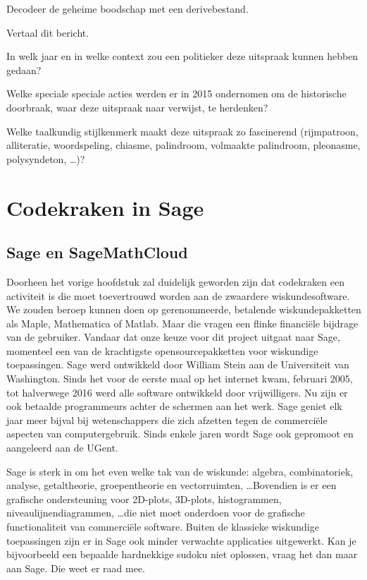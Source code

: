 \begin{oef}
Decodeer de geheime boodschap met een derivebestand.

\begin{enumoef}
\item Vertaal dit bericht. 
\item In welk jaar en in welke context zou een politieker deze uitspraak  kunnen hebben gedaan? 
\item Welke speciale speciale acties werden er in 2015 ondernomen om de historische doorbraak, waar deze uitspraak naar verwijst, te herdenken?
\item Welke taalkundig stijlkenmerk maakt deze uitspraak zo fascinerend (rijmpatroon, alliteratie, woordspeling, chiasme, palindroom, volmaakte palindroom, pleonasme, polysyndeton, \dots)?
\end{enumoef}
\end{oef}

\newpage


\section{Codekraken in Sage}
\subsection{Sage en SageMathCloud}
Doorheen het vorige hoofdstuk zal duidelijk geworden zijn dat codekraken een activiteit is die moet toevertrouwd worden aan de zwaardere wiskundesoftware. We zouden beroep kunnen doen op gerenommeerde, betalende wiskundepakketten als Maple, Mathematica of Matlab. Maar die vragen een flinke financiële bijdrage van de gebruiker. Vandaar dat onze keuze voor dit project uitgaat naar Sage, momenteel een van de krachtigste opensourcepakketten voor wiskundige toepassingen. Sage werd ontwikkeld door William Stein aan de Universiteit van Washington. Sinds het voor de eerste maal op het internet kwam, februari 2005, tot halverwege 2016 werd alle software ontwikkeld door vrijwilligers. Nu zijn er ook betaalde programmeurs achter de schermen aan het werk. Sage geniet elk jaar meer bijval bij wetenschappers die zich afzetten tegen de commerciële aspecten van computergebruik. Sinds enkele jaren wordt Sage ook gepromoot en aangeleerd aan de UGent.

Sage is sterk in om het even welke tak van de wiskunde: algebra, combinatoriek, analyse, getaltheorie, groepentheorie en vectorruimten, \dots Bovendien is er een  grafische ondersteuning voor 2D-plots, 3D-plots, histogrammen, niveaulijnendiagrammen, \dots die niet moet onderdoen voor de grafische functionaliteit van commerciële software. Buiten de klassieke wiskundige toepassingen zijn er in Sage ook minder verwachte applicaties uitgewerkt. Kan je bijvoorbeeld een bepaalde hardnekkige sudoku niet oplossen, vraag het dan maar aan Sage. Die weet er raad mee.

